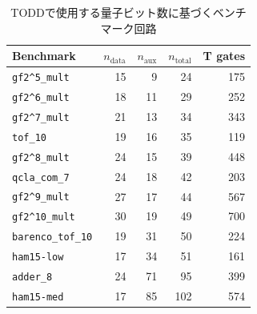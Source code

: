 \begin{table}[t]
  \centering
  \caption{TODDで使用する量子ビット数に基づくベンチマーク回路}
  \label{tab:benchmark-circuits-todd-qubits}
  \small
  \setlength{\tabcolsep}{5pt}
  \renewcommand{\arraystretch}{1.12}
  \begin{tabular}{lrrrr}
    \toprule
    Benchmark & $n_{\mathrm{data}}$ & $n_{\mathrm{aux}}$ & $n_{\mathrm{total}}$ & T gates \\
    \midrule
    \texttt{gf2\textasciicircum5\_mult}   & 15 &  9 &  24 & 175 \\
    \texttt{gf2\textasciicircum6\_mult}   & 18 & 11 &  29 & 252 \\
    \texttt{gf2\textasciicircum7\_mult}   & 21 & 13 &  34 & 343 \\
    \texttt{tof\_10}                       & 19 & 16 &  35 & 119 \\
    \texttt{gf2\textasciicircum8\_mult}   & 24 & 15 &  39 & 448 \\
    \texttt{qcla\_com\_7}                 & 24 & 18 &  42 & 203 \\
    \texttt{gf2\textasciicircum9\_mult}   & 27 & 17 &  44 & 567 \\
    \texttt{gf2\textasciicircum10\_mult}  & 30 & 19 &  49 & 700 \\
    \texttt{barenco\_tof\_10}             & 19 & 31 &  50 & 224 \\
    \texttt{ham15-low}                     & 17 & 34 &  51 & 161 \\
    \texttt{adder\_8}                      & 24 & 71 &  95 & 399 \\
    \texttt{ham15-med}                     & 17 & 85 & 102 & 574 \\
    \bottomrule
  \end{tabular}
\end{table}
